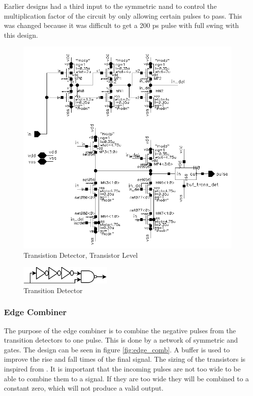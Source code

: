\documentclass[a4paper,12pt]{article} \usepackage{graphicx}
\begin{document}
Earlier designs had a third input to the symmetric nand to control the
multiplication factor of the circuit by only allowing certain pulses to pass.
This was changed because it was difficult to get a 200 ps pulse with full swing
with this design.

\begin{figure}[p]
        \centering
        \includegraphics[width=\textwidth]{../Bilder/trans_detect_trans.png}
        \caption{Transistion Detector, Transistor Level}
        \label{fig:trans_detect_trans}
\end{figure}

\begin{figure}[p]
        \centering
        \includegraphics[width=0.4\textwidth]{../Bilder/trans_detect.png}
        \caption{Transition Detector}
        \label{fig:trans_detect}
\end{figure}

\subsubsection{Edge Combiner}
The purpose of the edge combiner is to combine the negative pulses from the
transition detectors to one pulse. This is done by a network of symmetric and
gates. The design can be seen in figure \ref{fig:edge_comb}. A buffer is used to
improve the rise and fall times of the final signal.
The sizing of the transistors is inspired from \cite{dll_report}.
It is important that the incoming pulses are not too wide to be able to combine
them to a signal. If they are too wide they will be combined to a constant zero,
which will not produce a valid output.
\end{document}
